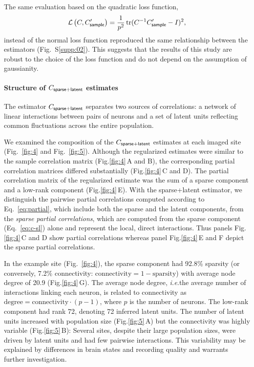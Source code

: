 \documentclass[10pt]{article}
\DeclareMathOperator{\Tr}{tr}
\newcommand{\figref}[2]{Fig.\;\ref{fig:#1}\,#2}
\newcommand{\loss}[1]{\mathcal L\left(#1\right)}
\newcommand{\ie}{\emph{i.e.}\;}
\begin{document}
The same evaluation based on the quadratic loss function,
\begin{equation}\label{eq:quad}
\loss{C,C_{\sf sample}^\prime}=\frac 1 {p^2}\Tr(C^{-1}C_{\sf sample}^\prime-I)^2,
\end{equation}
instead of the normal loss function reproduced the same relationship between the estimators (Fig.~S\ref{supp:02}). This suggests that the results of this study are robust to the choice of the loss function and do not depend on the assumption of gaussianity. 

\paragraph{Structure of $C_{\sf sparse+latent}$ estimates}
The estimator $C_{\sf sparse+latent}$ separates two sources of correlations: a network of linear interactions between pairs of neurons and a set of latent units reflecting common fluctuations across the entire population.  

We examined the composition of the $C_{\sf sparse+latent}$ estimates at each imaged site (Fig.~\ref{fig:4} and Fig.~\ref{fig:5}). Although the regularized estimates were similar to the sample correlation matrix (\figref{4}{A and B}), the corresponding partial correlation matrices differed substantially (\figref{4}{C and D}). The partial correlation matrix of the regularized estimate was the sum of a sparse component and a low-rank component (\figref{4}{E}).  With the sparse+latent estimator, we distinguish the pairwise partial correlations computed according to Eq.~\ref{eq:partial}, which include both the sparse and the latent components, from the \emph{sparse partial correlations}, which are computed from the sparse component (Eq.~\ref{eq:c-sl}) alone and represent the local, direct interactions. Thus panels \figref{4}{C and D} show partial correlations whereas panel \figref{4}{E and F} depict the sparse partial correlations.

In the example site (Fig.~\ref{fig:4}), the sparse component had 92.8\% sparsity (or conversely, 7.2\% connectivity: $\mbox{connectivity}=1-\mbox{sparsity}$) with average node degree of 20.9 (\figref{4}{G}). The average node degree, \ie the average number of interactions linking each neuron, is related to connectivity as $\mbox{degree} = \mbox{connectivity}\cdot(p-1)$, where $p$ is the number of neurons. The low-rank component had rank 72, denoting 72 inferred latent units. The number of latent units increased with population size (\figref{5}{A}) but the connectivity was highly variable (\figref{5}{B}): Several sites, despite their large population sizes, were driven by latent units and had few pairwise interactions. This variability may be explained by differences in brain states and recording quality and warrants further investigation.
\end{document}
